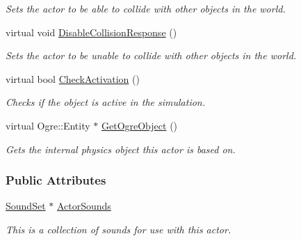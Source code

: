 \begin{DoxyCompactItemize}
\begin{DoxyCompactList}\small\item\em Sets the actor to be able to collide with other objects in the world. \item\end{DoxyCompactList}\item 
virtual void \hyperlink{classphys_1_1ActorBase_a23b32c9a9959a9d3b0f883d9b0eac460}{DisableCollisionResponse} ()
\begin{DoxyCompactList}\small\item\em Sets the actor to be unable to collide with other objects in the world. \item\end{DoxyCompactList}\item 
virtual bool \hyperlink{classphys_1_1ActorBase_aacf6737ed91267cb4aa54d4c33eb1ad0}{CheckActivation} ()
\begin{DoxyCompactList}\small\item\em Checks if the object is active in the simulation. \item\end{DoxyCompactList}\item 
virtual Ogre::Entity $\ast$ \hyperlink{classphys_1_1ActorBase_aeecbf5005d2ae29e037a0271258ba6d8}{GetOgreObject} ()
\begin{DoxyCompactList}\small\item\em Gets the internal physics object this actor is based on. \item\end{DoxyCompactList}\end{DoxyCompactItemize}
\subsubsection*{Public Attributes}
\begin{DoxyCompactItemize}
\item 
\hypertarget{classphys_1_1ActorBase_a2d56e2b3470bfc7dfc6d9ce8c4158d81}{
\hyperlink{namespacephys_ab780c3162da5699fe421f3739ba03fc4}{SoundSet} $\ast$ \hyperlink{classphys_1_1ActorBase_a2d56e2b3470bfc7dfc6d9ce8c4158d81}{ActorSounds}}
\label{d8/d0f/classphys_1_1ActorBase_a2d56e2b3470bfc7dfc6d9ce8c4158d81}

\begin{DoxyCompactList}\small\item\em This is a collection of sounds for use with this actor. \item\end{DoxyCompactList}\end{DoxyCompactItemize}
